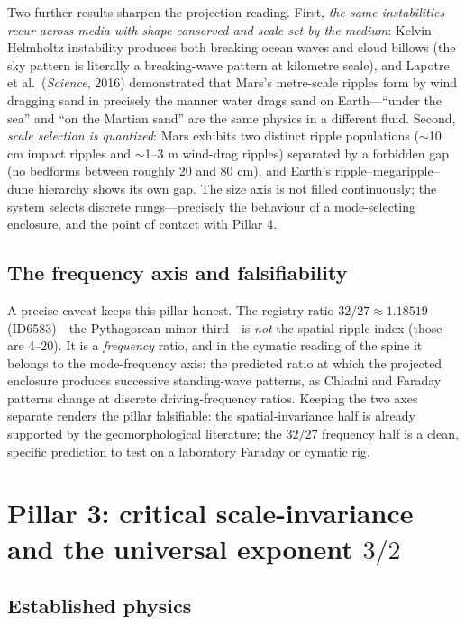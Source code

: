 \documentclass[11pt]{article}
\theoremstyle{remark}
\begin{document}
Two further results sharpen the projection reading. First, \emph{the same instabilities recur across media with shape conserved and scale set by the medium}: Kelvin--Helmholtz instability produces both breaking ocean waves and cloud billows (the sky pattern is literally a breaking-wave pattern at kilometre scale), and Lapotre et al.\ (\emph{Science}, 2016) demonstrated that Mars's metre-scale ripples form by wind dragging sand in precisely the manner water drags sand on Earth---``under the sea'' and ``on the Martian sand'' are the same physics in a different fluid. Second, \emph{scale selection is quantized}: Mars exhibits two distinct ripple populations ($\sim$10 cm impact ripples and $\sim$1--3 m wind-drag ripples) separated by a forbidden gap (no bedforms between roughly 20 and 80 cm), and Earth's ripple--megaripple--dune hierarchy shows its own gap. The size axis is not filled continuously; the system selects discrete rungs---precisely the behaviour of a mode-selecting enclosure, and the point of contact with Pillar 4.

\subsection{The frequency axis and falsifiability}

A precise caveat keeps this pillar honest. The registry ratio $32/27 \approx 1.18519$ (ID6583)---the Pythagorean minor third---is \emph{not} the spatial ripple index (those are 4--20). It is a \emph{frequency} ratio, and in the cymatic reading of the spine it belongs to the mode-frequency axis: the predicted ratio at which the projected enclosure produces successive standing-wave patterns, as Chladni and Faraday patterns change at discrete driving-frequency ratios. Keeping the two axes separate renders the pillar falsifiable: the spatial-invariance half is already supported by the geomorphological literature; the $32/27$ frequency half is a clean, specific prediction to test on a laboratory Faraday or cymatic rig.

\section{Pillar 3: critical scale-invariance and the universal exponent \texorpdfstring{$3/2$}{3/2}}
\label{sec:pillar3}

\subsection{Established physics}
\end{document}
